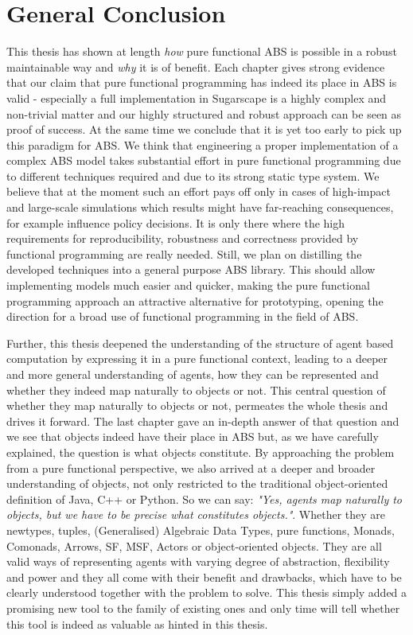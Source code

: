 \chapter{General Conclusion}
\label{ch:conclusion}

This thesis has shown at length \textit{how} pure functional ABS is possible in a robust maintainable way and \textit{why} it is of benefit. Each chapter gives strong evidence that our claim that pure functional programming has indeed its place in ABS is valid - especially a full implementation in Sugarscape is a highly complex and non-trivial matter and our highly structured and robust approach can be seen as proof of success. At the same time we conclude that it is yet too early to pick up this paradigm for ABS. We think that engineering a proper implementation of a complex ABS model takes substantial effort in pure functional programming due to different techniques required and due to its strong static type system. We believe that at the moment such an effort pays off only in cases of high-impact and large-scale simulations which results might have far-reaching consequences, for example influence policy decisions. It is only there where the high requirements for reproducibility, robustness and correctness provided by functional programming are really needed. Still, we plan on distilling the developed techniques into a general purpose ABS library. This should allow implementing models much easier and quicker, making the pure functional programming approach an attractive alternative for prototyping, opening the direction for a broad use of functional programming in the field of ABS.

Further, this thesis deepened the understanding of the structure of agent based computation by expressing it in a pure functional context, leading to a deeper and more general understanding of agents, how they can be represented and whether they indeed map naturally to objects or not. This central question of whether they map naturally to objects or not, permeates the whole thesis and drives it forward. The last chapter gave an in-depth answer of that question and we see that objects indeed have their place in ABS but, as we have carefully explained, the question is what objects constitute. By approaching the problem from a pure functional perspective, we also arrived at a deeper and broader understanding of objects, not only restricted to the traditional object-oriented definition of Java, C++ or Python. So we can say: \textit{"Yes, agents map naturally to objects, but we have to be precise what constitutes objects."}. Whether they are newtypes, tuples, (Generalised) Algebraic Data Types, pure functions, Monads, Comonads, Arrows, SF, MSF, Actors or object-oriented objects. They are all valid ways of representing agents with varying degree of abstraction, flexibility and power and they all come with their benefit and drawbacks, which have to be clearly understood together with the problem to solve. This thesis simply added a promising new tool to the family of existing ones and only time will tell whether this tool is indeed as valuable as hinted in this thesis.


